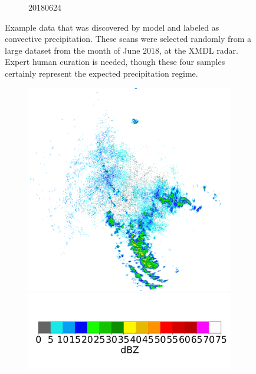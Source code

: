 \begin{figure}[ht]
\begin{subfigure}[b]{0.45\textwidth}
		\caption{20180624}
		\label{fig:classifying_datadiscovery_ex4}
	\end{subfigure}
	\caption{Example data that was discovered by model and labeled as convective precipitation. These scans were selected randomly from a large dataset from the month of June 2018, at the XMDL radar. Expert human curation is needed, though these four samples certainly represent the expected precipitation regime.}
	\label{fig:classifying_datadiscovery}
\end{figure}

\begin{figure}[ht]
	\centering
	\begin{subfigure}[b]{0.45\textwidth}
		\includegraphics[width=\textwidth]{./thesis_code/plots/midlothian-tx-20180903-063419-ref.png}
		\includegraphics[width=\textwidth]{./thesis_code/plots/dfw_colormap.png}

\end{subfigure}
\end{figure}
